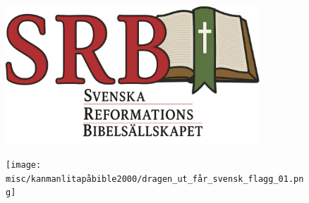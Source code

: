 \begin{figure}[h!]
  \centering
  \begin{adjustbox}{center}
    \includegraphics[width=0.85\textwidth]{misc/srb_logo_2025/main_srb_v16_lower_text_innershadow.png}
  \end{adjustbox}
\end{figure}

\begin{figure}[h!]
  \centering
  \begin{adjustbox}{center}
    \texttt{[image: misc/kanmanlitapåbible2000/dragen\_ut\_får\_svensk\_flagg\_01.png]}
  \end{adjustbox}
\end{figure}